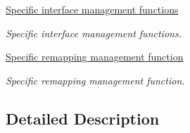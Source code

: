 \begin{DoxyCompactItemize}
\hyperlink{group___t_i_m___group8}{Specific interface management functions}
\begin{DoxyCompactList}\small\item\em Specific interface management functions. \end{DoxyCompactList}\item 
\hyperlink{group___t_i_m___group9}{Specific remapping management function}
\begin{DoxyCompactList}\small\item\em Specific remapping management function. \end{DoxyCompactList}\end{DoxyCompactItemize}


\subsection{Detailed Description}
